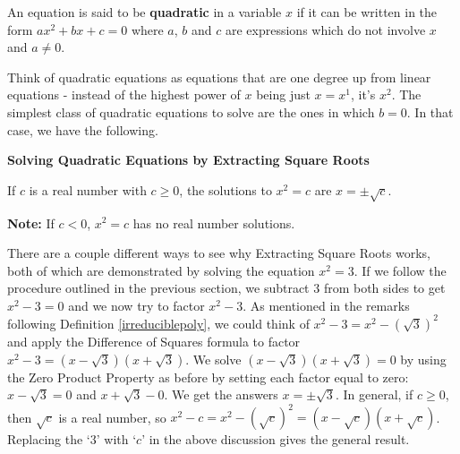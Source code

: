 \documentclass{ximera}
\begin{document}
\colorbox{ResultColor}{\bbm

\begin{definition}\label{quadeqndefn} An equation is said to be \textbf{quadratic} in a variable $x$ if it can be written in the form $ax^2 + bx + c = 0$ where $a$, $b$ and $c$ are expressions which do not involve $x$ and $a \neq 0$.

\end{definition}


\medskip

Think of quadratic equations as equations that are one degree up from linear equations - instead of the highest power of $x$ being just $x = x^1$, it's $x^2$.  The simplest class of quadratic equations to solve are the ones in which $b = 0$.  In that case, we have the following.

\medskip

\label{extractingthesquareroot}

\colorbox{ResultColor}{\bbm

\centerline{\textbf{Solving Quadratic Equations by Extracting Square Roots}}
\vspace{.05in}
If $c$ is a real number with $c \geq 0$, the solutions to $x^2 = c$ are $x = \pm \sqrt{c}$.

\vspace{.05in}
\textbf{Note:}  If $c < 0$, $x^2 = c$ has no real number solutions.


\medskip

There are a couple different ways to see why Extracting Square Roots works, both of which are demonstrated by solving the equation $x^2 = 3$.  If we follow the procedure outlined in the previous section, we subtract $3$ from both sides to get $x^2 - 3 = 0$ and we now try to factor $x^2 - 3$.   As mentioned in the remarks following Definition \ref{irreduciblepoly}, we could think of $x^2 - 3 = x^2 - (\sqrt{3})^2$ and apply the Difference of Squares formula to factor $x^2 - 3 = (x-\sqrt{3})(x+\sqrt{3})$.  We solve $(x-\sqrt{3})(x+\sqrt{3}) = 0$ by using the Zero Product Property as before by setting each factor equal to zero:  $x - \sqrt{3} = 0$ and $x+\sqrt{3} - 0$.  We get the answers $x = \pm \sqrt{3}$.  In general,  if $c \geq 0$, then $\sqrt{c}$ is a real number, so  $x^2 - c = x^2 - (\sqrt{c})^2 = (x-\sqrt{c})(x+\sqrt{c})$.  Replacing the `$3$' with `$c$' in the above discussion gives the general result. 

}}
\end{document}
